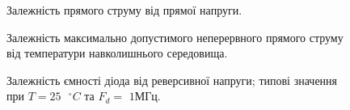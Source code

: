 \documentclass[a4paper,14pt]{extreport}
\begin{document}
\begin{center}
  \begin{figure}[h!]\label{im5}
      \caption{Залежність прямого струму від прямої напруги.}
  \end{figure}
  \begin{figure}[h!]\label{im6}
    \caption{Залежність максимально допустимого неперервного прямого струму від температури навколишнього середовища.}
    \end{figure}
    \begin{figure}[h!]\label{im7}
      \caption{Залежність ємності діода від реверсивної напруги; типові значення при $T=25\text{ }^{\circ}C \text{ та } F_d= \text{ 1МГц}$.}
      \end{figure}
\end{center}
\clearpage
\end{document}
